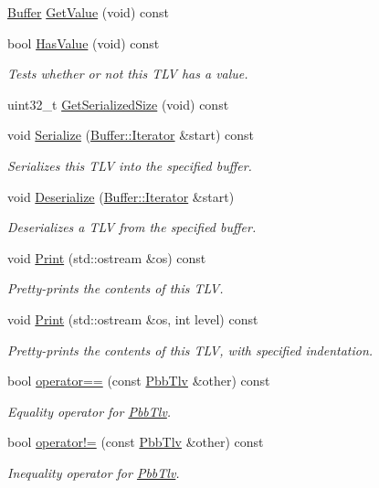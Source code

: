 \begin{DoxyCompactItemize}
\hyperlink{classns3_1_1Buffer}{Buffer} \hyperlink{classns3_1_1PbbTlv_a78f4e8e511b90f2b40aca1dd134193c5}{Get\+Value} (void) const 
\item 
bool \hyperlink{classns3_1_1PbbTlv_aaad2c3255366688140ec008a3377d6d4}{Has\+Value} (void) const 
\begin{DoxyCompactList}\small\item\em Tests whether or not this T\+LV has a value. \end{DoxyCompactList}\item 
uint32\+\_\+t \hyperlink{classns3_1_1PbbTlv_a01e918d1ab6710def3300bf3f620d5fb}{Get\+Serialized\+Size} (void) const 
\item 
void \hyperlink{classns3_1_1PbbTlv_a5e1a30c5ab57944ac2b361352660fd2e}{Serialize} (\hyperlink{classns3_1_1Buffer_1_1Iterator}{Buffer\+::\+Iterator} \&start) const 
\begin{DoxyCompactList}\small\item\em Serializes this T\+LV into the specified buffer. \end{DoxyCompactList}\item 
void \hyperlink{classns3_1_1PbbTlv_af1d0a54c2c334935bac7570889b275e4}{Deserialize} (\hyperlink{classns3_1_1Buffer_1_1Iterator}{Buffer\+::\+Iterator} \&start)
\begin{DoxyCompactList}\small\item\em Deserializes a T\+LV from the specified buffer. \end{DoxyCompactList}\item 
void \hyperlink{classns3_1_1PbbTlv_a06e3a10950727f95ff0e5205490cb8ea}{Print} (std\+::ostream \&os) const 
\begin{DoxyCompactList}\small\item\em Pretty-\/prints the contents of this T\+LV. \end{DoxyCompactList}\item 
void \hyperlink{classns3_1_1PbbTlv_a3e272400317c24c247d532a53cade4ae}{Print} (std\+::ostream \&os, int level) const 
\begin{DoxyCompactList}\small\item\em Pretty-\/prints the contents of this T\+LV, with specified indentation. \end{DoxyCompactList}\item 
bool \hyperlink{classns3_1_1PbbTlv_af13bc24ac7a574cf901147ea397c0cf9}{operator==} (const \hyperlink{classns3_1_1PbbTlv}{Pbb\+Tlv} \&other) const 
\begin{DoxyCompactList}\small\item\em Equality operator for \hyperlink{classns3_1_1PbbTlv}{Pbb\+Tlv}. \end{DoxyCompactList}\item 
bool \hyperlink{classns3_1_1PbbTlv_a7a4da2a8d943cbf07ffa2b152fd86fdd}{operator!=} (const \hyperlink{classns3_1_1PbbTlv}{Pbb\+Tlv} \&other) const 
\begin{DoxyCompactList}\small\item\em Inequality operator for \hyperlink{classns3_1_1PbbTlv}{Pbb\+Tlv}. \end{DoxyCompactList}\end{DoxyCompactItemize}
